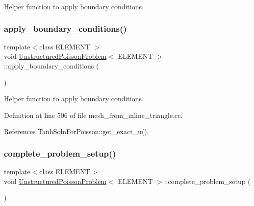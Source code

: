 Helper function to apply boundary conditions. 

\mbox{\label{classUnstructuredPoissonProblem_ace8b8b3097ae2024a0589b2bf9b4ee7b}} 
\subsubsection{\texorpdfstring{apply\+\_\+boundary\+\_\+conditions()}{apply\_boundary\_conditions()}\hspace{0.1cm}{\footnotesize\ttfamily [2/2]}}
{\footnotesize\ttfamily template$<$class E\+L\+E\+M\+E\+NT $>$ \\
void \hyperlink{classUnstructuredPoissonProblem}{Unstructured\+Poisson\+Problem}$<$ E\+L\+E\+M\+E\+NT $>$\+::apply\+\_\+boundary\+\_\+conditions (\begin{DoxyParamCaption}{ }\end{DoxyParamCaption})\hspace{0.3cm}{\ttfamily [private]}}



Helper function to apply boundary conditions. 



Definition at line 506 of file mesh\+\_\+from\+\_\+inline\+\_\+triangle.\+cc.



References Tanh\+Soln\+For\+Poisson\+::get\+\_\+exact\+\_\+u().

\mbox{\label{classUnstructuredPoissonProblem_a5cbf00790e8469b43c64c6aaadfe7b41}} 
\subsubsection{\texorpdfstring{complete\+\_\+problem\+\_\+setup()}{complete\_problem\_setup()}\hspace{0.1cm}{\footnotesize\ttfamily [1/2]}}
{\footnotesize\ttfamily template$<$class E\+L\+E\+M\+E\+NT$>$ \\
void \hyperlink{classUnstructuredPoissonProblem}{Unstructured\+Poisson\+Problem}$<$ E\+L\+E\+M\+E\+NT $>$\+::complete\+\_\+problem\+\_\+setup (\begin{DoxyParamCaption}{ }\end{DoxyParamCaption})\hspace{0.3cm}{\ttfamily [private]}}



